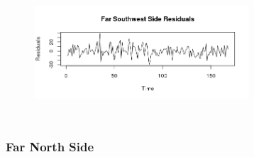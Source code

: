 \documentclass{article} %
\begin{document}
\begin{center}
\begin{figure}[H]
\includegraphics[height=50mm, width=80mm]{Plots/far_southwest_resid.png}
\end{figure}
\end{center}
 

 
\subsubsection{Far North Side}
 
\end{document}
